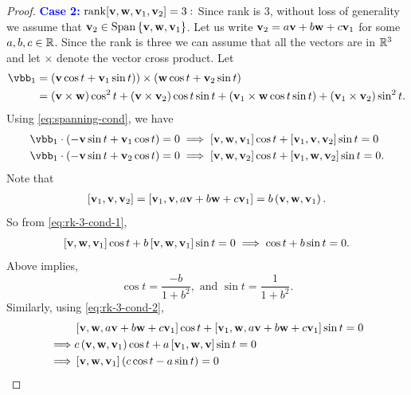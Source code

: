 \begin{proof}
	\vspace{0.3cm}
	\noindent \textcolor{blue}{\textbf{Case 2:}} $\operatorname{rank}[\mathbf{v},\mathbf{w},\mathbf{v}_1,\mathbf{v}_2]=3:$ Since rank is $3$, without loss of generality we assume that $\mathbf{v}_2\in  \operatorname{Span}\left\{\mathbf{v},\mathbf{w},\mathbf{v}_1\right\}$. Let us write $\mathbf{v}_2= a \mathbf{v}+b\mathbf{w}+c\mathbf{v}_1$ for some $a,b,c\in \mathbb{R}$. Since the rank is three we can assume that all the vectors are in $\mathbb{R}^3$ and let $\times$ denote the vector cross product. Let 
	\begin{align*}
		\vbb_1 & = \left(\vbf\cos t+\vbf_1\sin t)\right) \times \left(\wbf\cos t+\vbf_2\sin t\right) \\ 
		& = (\vbf\times \wbf)\cos^2 t+ \left(\vbf\times \vbf_2\right)\cos t\sin t+ \left(\vbf_1\times \wbf\cos t\sin t\right)+ \left(
		\vbf_1\times \vbf_2\right)\sin^2 t. 
	\end{align*}
	Using \eqref{eq:spanning-cond}, we have 
	\begin{align}
		\vbb_1 \cdot \left(-\vbf\sin t+\vbf_1\cos t\right)=0 & \implies \left[\vbf,\wbf,\vbf_1\right]\cos t+\left[\vbf_1,\vbf,\vbf_2\right]\sin t=0 \label{eq:rk-3-cond-1} \\
		\vbb_1 \cdot \left(-\vbf\sin t+\vbf_2\cos t\right)=0 & \implies \left[\vbf,\wbf,\vbf_2\right]\cos t+\left[\vbf_1,\wbf,\vbf_2\right]\sin t=0 \label{eq:rk-3-cond-2}.
	\end{align}
	Note that 
	\begin{align*}
		\left[\mathbf{v}_1,\mathbf{v},\mathbf{v}_2\right] = \left[\mathbf{v}_1,\mathbf{v},a\mathbf{v}+b\mathbf{w}+c\mathbf{v}_1\right] = b \left(\mathbf{v},\mathbf{w},\mathbf{v}_1\right).
	\end{align*}
	So from \eqref{eq:rk-3-cond-1},
	\begin{equation}
		 \left[\mathbf{v},\mathbf{w},\mathbf{v}_1\right]\cos t+ b \left[\mathbf{v},\mathbf{w},\mathbf{v}_1\right]\sin t = 0  \implies \cos t+ b\sin t=0 \label{eq:cos+bsin=0}. 
	\end{equation}
	Above implies, 
	\begin{displaymath}
		 \cos t= \frac{-b}{1+b^2},\text{ and } \sin t=\frac{1}{1+b^2}.
	\end{displaymath}
	Similarly, using \eqref{eq:rk-3-cond-2},
	\begin{align}
		& \left[\vbf,\wbf,a\vbf+b\wbf+c\vbf_1\right]\cos t+ \left[\vbf_1,\wbf,a\vbf+b\wbf+c\vbf_1\right]\sin t = 0 \nonumber \\
		\implies & c \left(\vbf,\wbf,\vbf_1\right)\cos t+ a \left[\vbf_1,\wbf,\vbf\right]\sin t= 0 \nonumber\\ 
		\implies & \left[\vbf,\wbf,\vbf_1\right](c \cos t-a\sin t)=0 \nonumber \\

\end{align}
\end{proof}

